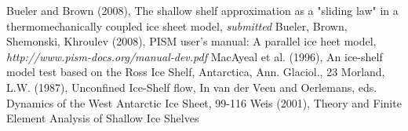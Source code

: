 \documentclass[a4paper,10pt]{article}
\begin{document}
\begin{thebibliography}{2}
 Bueler and Brown (2008), The shallow shelf approximation as a "sliding law" in a thermomechanically coupled ice sheet model, \emph{submitted} 
 Bueler, Brown, Shemonski, Khroulev (2008), PISM user's manual: A parallel ice heet model, \emph{http://www.pism-docs.org/manual-dev.pdf} 
 MacAyeal et al. (1996), An ice-shelf model test based on the Ross Ice Shelf,
Antarctica, Ann. Glaciol., 23
 Morland, L.W. (1987), Unconfined Ice-Shelf flow,
In van der Veen and Oerlemans, eds. Dynamics of the West Antarctic Ice Sheet, 99-116 
 Weis (2001), Theory and Finite Element Analysis of Shallow Ice Shelves
\end{thebibliography}
\end{document}
